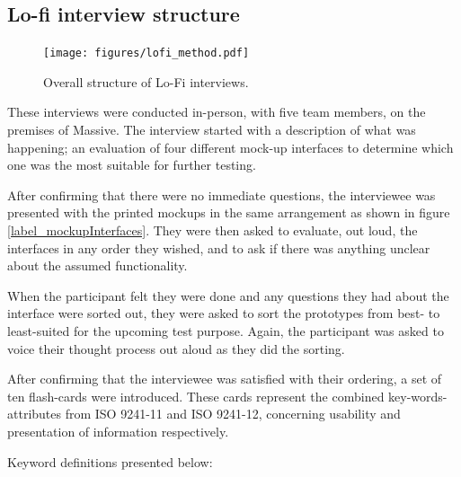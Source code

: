 \documentclass[nofilelist,dvipsnames]{cslthse-msc}
\begin{document}
      \subsection{Lo-fi interview structure}

        \begin{figure}[h!]
          \centering
          \texttt{[image: figures/lofi\_method.pdf]}
          \caption{Overall structure of Lo-Fi interviews.}
        \end{figure}

        These interviews were conducted in-person, with five team members, on
        the premises of Massive. The interview started with a description of
        what was happening; an evaluation of four different mock-up interfaces
        to determine which one was the most suitable for further testing.

        After confirming that there were no immediate questions, the
        interviewee was presented with the printed mockups in the same
        arrangement as shown in figure \ref{label_mockupInterfaces}. They were
        then asked to evaluate, out loud, the interfaces in any order they
        wished, and to ask if there was anything unclear about the assumed
        functionality.

        When the participant felt they were done and any questions they had
        about the interface were sorted out, they were asked to sort the
        prototypes from best- to least-suited for the upcoming test purpose.
        Again, the participant was asked to voice their thought process out
        aloud as they did the sorting.

        After confirming that the interviewee was satisfied with their
        ordering, a set of ten flash-cards were introduced. These cards
        represent the combined key-words-attributes from ISO 9241-11 and ISO
        9241-12, concerning usability and presentation of information
        respectively.

        Keyword definitions presented below:
\end{document}
